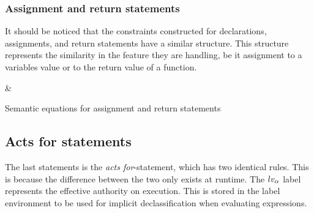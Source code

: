 \subsubsection{Assignment and return statements}
It should be noticed that the constraints constructed for declarations, assignments, and return statements have a similar structure.
This structure represents the similarity in the feature they are handling, be it assignment to a variables value or to the return value of a function.

\begin{table}[H]
\begin{semanticequations}
 \seSpace
& \seSpace
\end{semanticequations}
\caption{Semantic equations for assignment and return statements}
\label{cstr:assignment_return}
\end{table}

\subsection{Acts for statements}
The last statements is the \emph{acts for}-statement, which has two identical rules.
This is because the difference between the two only exists at runtime.
The $lv_\alpha$ label represents the effective authority on execution.
This is stored in the label environment to be used for implicit declassification when evaluating expressions.

